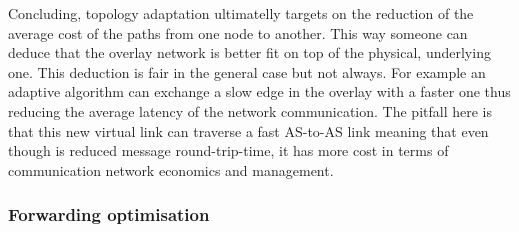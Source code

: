 Concluding, topology adaptation ultimatelly targets on the reduction of the
average cost of the paths from one node to another. This way someone can deduce
that the overlay network is better fit on top of the physical, underlying one.
This deduction is fair in the general case but not always. For example an
adaptive algorithm can exchange a slow edge in the overlay with a faster one
thus reducing the average latency of the network communication. The pitfall here
is that this new virtual link can traverse a fast AS-to-AS link meaning that
even though is reduced message round-trip-time, it has more cost in terms of
communication network economics and management.

%
%
%
%

\subsubsection{Forwarding optimisation}

